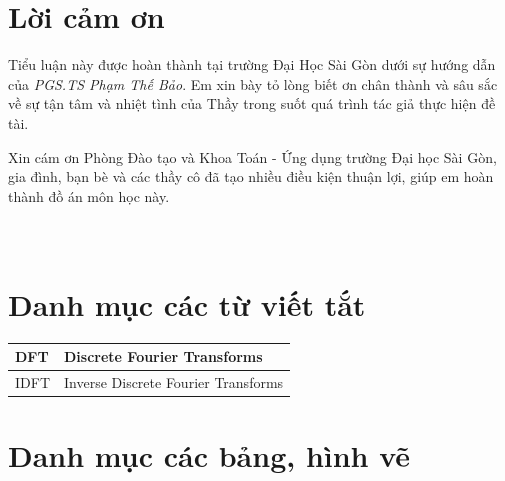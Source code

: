 \documentclass[12pt,a4paper]{report}
\numberwithin{equation}{section}
\theoremstyle{definition} %
\begin{document}
	\chapter*{Lời cảm ơn}
	\thispagestyle{fancy}
	\vspace{1cm}
	\indent
	
Tiểu luận này được hoàn thành tại trường Đại Học Sài Gòn dưới sự hướng dẫn của \textit{PGS.TS Phạm Thế Bảo}. Em xin bày tỏ lòng biết ơn chân thành và sâu sắc về sự tận tâm và nhiệt tình của Thầy trong suốt quá trình tác giả thực hiện đề tài.
	
	
	\bigskip
	Xin cám ơn Phòng Đào tạo  và Khoa Toán - Ứng dụng trường Đại học Sài Gòn, gia đình, bạn bè  và các thầy cô đã tạo nhiều điều kiện thuận lợi, giúp em hoàn thành đồ án môn học này.
	\\
	\\
	\\

	
	\rightline{\textbf{}\hspace*{0.9cm}}
	\newpage
	
	\tableofcontents

	\chapter*{Danh mục các từ viết tắt  }
\thispagestyle{fancy}
\vspace{1cm}
\indent

\begin{center}
	\begin{tabular}{ |p{3cm}|p{5cm}|  }
		\hline
		DFT & Discrete Fourier Transforms  \\ \hline
		IDFT & Inverse Discrete Fourier Transforms  \\ \hline
	\end{tabular}
\end{center}

	\chapter*{Danh mục các bảng, hình vẽ  }
\thispagestyle{fancy}
\vspace{1cm}
\indent
\end{document}
